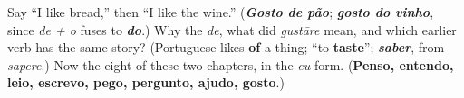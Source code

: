 \begin{tcolorbox}[breakable,colback=teal!4,colframe=teal!35!black,title={Before you move on}]
Say \textquotedblleft{}I like bread,\textquotedblright{} then \textquotedblleft{}I like the wine.\textquotedblright{} (\emph{\textbf{Gosto de pão}}; \emph{\textbf{gosto do vinho}}, since \emph{de + o} fuses to \emph{\textbf{do}}.) Why the \emph{de}, what did \emph{gustāre} mean, and which earlier verb has the same story? (Portuguese likes \textbf{of} a thing; \textquotedblleft{}to \textbf{taste}\textquotedblright{}; \emph{\textbf{saber}}, from \emph{sapere}.) Now the eight of these two chapters, in the \emph{eu} form. (\textbf{Penso, entendo, leio, escrevo, pego, pergunto, ajudo, gosto}.)
\end{tcolorbox}
